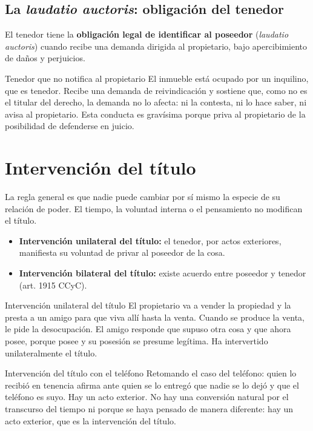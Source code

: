 \documentclass[12pt,oneside]{book}
\begin{document}
\subsection{La \textit{laudatio auctoris}: obligación del tenedor}

El tenedor tiene la \textbf{obligación legal de identificar al poseedor} (\textit{laudatio auctoris}) cuando recibe una demanda dirigida al propietario, bajo apercibimiento de daños y perjuicios.

\begin{example}{Tenedor que no notifica al propietario}
El inmueble está ocupado por un inquilino, que es tenedor. Recibe una demanda de reivindicación y sostiene que, como no es el titular del derecho, la demanda no lo afecta: ni la contesta, ni lo hace saber, ni avisa al propietario. Esta conducta es gravísima porque priva al propietario de la posibilidad de defenderse en juicio.
\end{example}

\section{Intervención del título}

La regla general es que nadie puede cambiar por sí mismo la especie de su relación de poder. El tiempo, la voluntad interna o el pensamiento no modifican el título.

\begin{itemize}
    \item \textbf{Intervención unilateral del título:} el tenedor, por actos exteriores, manifiesta su voluntad de privar al poseedor de la cosa.
    \item \textbf{Intervención bilateral del título:} existe acuerdo entre poseedor y tenedor (art. 1915 CCyC).
\end{itemize}

\begin{example}{Intervención unilateral del título}
El propietario va a vender la propiedad y la presta a un amigo para que viva allí hasta la venta. Cuando se produce la venta, le pide la desocupación. El amigo responde que supuso otra cosa y que ahora posee, porque posee y su posesión se presume legítima. Ha intervertido unilateralmente el título.
\end{example}

\begin{example}{Intervención del título con el teléfono}
Retomando el caso del teléfono: quien lo recibió en tenencia afirma ante quien se lo entregó que nadie se lo dejó y que el teléfono es suyo. Hay un acto exterior. No hay una conversión natural por el transcurso del tiempo ni porque se haya pensado de manera diferente: hay un acto exterior, que es la intervención del título.
\end{example}
\end{document}
